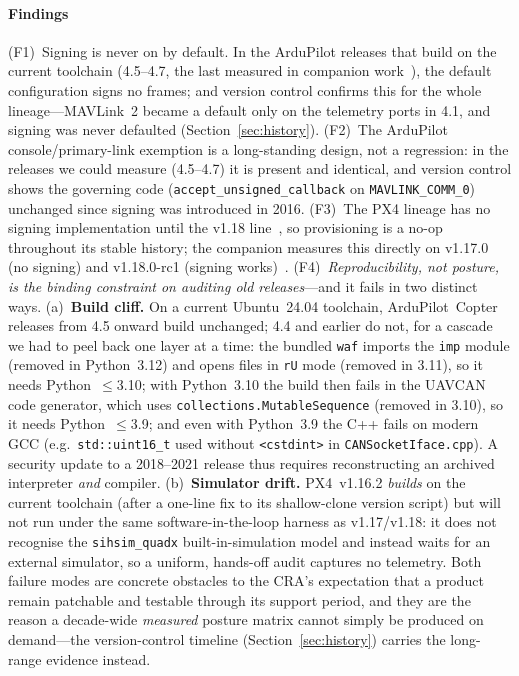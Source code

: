 \documentclass[conference]{IEEEtran}
\newcommand{\code}[1]{\texttt{#1}}
\begin{document}
\paragraph{Findings}
(F1)~Signing is never on by default. In the ArduPilot releases that build on the
current toolchain (4.5--4.7, the last measured in companion
work~\cite{brighouse2026signing}), the default configuration signs no frames; and
version control confirms this for the whole lineage---MAVLink~2 became a default
only on the telemetry ports in 4.1, and signing was never defaulted
(Section~\ref{sec:history}).
(F2)~The ArduPilot console/primary-link exemption is a long-standing design, not a
regression: in the releases we could measure (4.5--4.7) it is present and
identical, and version control shows the governing code
(\code{accept\_unsigned\_callback} on \code{MAVLINK\_COMM\_0}) unchanged since
signing was introduced in 2016.
(F3)~The PX4 lineage has no signing implementation until the v1.18
line~\cite{px4_signing_pr}, so provisioning is a no-op throughout its stable
history; the companion measures this directly on v1.17.0 (no signing) and
v1.18.0-rc1 (signing works)~\cite{brighouse2026signing}.
(F4)~\emph{Reproducibility, not posture, is the binding constraint on auditing old
releases}---and it fails in two distinct ways. (a)~\textbf{Build cliff.} On a
current Ubuntu~24.04 toolchain, ArduPilot~Copter releases from 4.5 onward build
unchanged; 4.4 and earlier do not, for a cascade we had to peel back one layer at
a time: the bundled \code{waf} imports the \code{imp} module (removed in
Python~3.12) and opens files in \code{rU} mode (removed in 3.11), so it needs
Python~$\le$3.10; with Python~3.10 the build then fails in the UAVCAN code
generator, which uses \code{collections.MutableSequence} (removed in 3.10), so it
needs Python~$\le$3.9; and even with Python~3.9 the C++ fails on modern GCC (e.g.\
\code{std::uint16\_t} used without \code{<cstdint>} in \code{CANSocketIface.cpp}).
A security update to a 2018--2021 release thus requires reconstructing an archived
interpreter \emph{and} compiler. (b)~\textbf{Simulator drift.} PX4~v1.16.2
\emph{builds} on the current toolchain (after a one-line fix to its shallow-clone
version script) but will not run under the same software-in-the-loop harness as
v1.17/v1.18: it does not recognise the \code{sihsim\_quadx} built-in-simulation
model and instead waits for an external simulator, so a uniform, hands-off audit
captures no telemetry. Both failure modes are concrete obstacles to the CRA's
expectation that a product remain patchable and testable through its support
period, and they are the reason a decade-wide \emph{measured} posture matrix
cannot simply be produced on demand---the version-control timeline
(Section~\ref{sec:history}) carries the long-range evidence instead.
\end{document}
